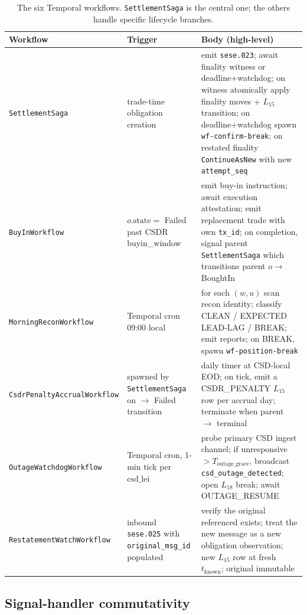 \documentclass[11pt,a4paper]{article}
\begin{document}
\begin{table}[h]
\centering
\begin{small}
\begin{tabular}{p{2.8cm}p{4.0cm}p{6.5cm}}
\toprule
\textbf{Workflow} & \textbf{Trigger} & \textbf{Body (high-level)} \\
\midrule
\texttt{SettlementSaga} & trade-time obligation creation & emit \texttt{sese.023}; await finality witness or deadline+watchdog; on witness atomically apply finality moves + $L_{15}$ transition; on deadline+watchdog spawn \texttt{wf-confirm-break}; on restated finality \texttt{ContinueAsNew} with new \texttt{attempt\_seq} \\
\texttt{BuyInWorkflow} & $o.\mathrm{state} = $ Failed past CSDR buyin\_window & emit buy-in instruction; await execution attestation; emit replacement trade with own \texttt{tx\_id}; on completion, signal parent \texttt{SettlementSaga} which transitions parent $o \to$ BoughtIn \\
\texttt{MorningReconWorkflow} & Temporal cron 09:00 local & for each $(w, u)$ scan recon identity; classify CLEAN / EXPECTED LEAD-LAG / BREAK; emit reports; on BREAK, spawn \texttt{wf-position-break} \\
\texttt{CsdrPenaltyAccrualWorkflow} & spawned by \texttt{SettlementSaga} on $\to$ Failed transition & daily timer at CSD-local EOD; on tick, emit a CSDR\_PENALTY $L_{15}$ row per accrual day; terminate when parent $\to$ terminal \\
\texttt{OutageWatchdogWorkflow} & Temporal cron, 1-min tick per $\mathrm{csd\_lei}$ & probe primary CSD ingest channel; if unresponsive $> T_{\mathrm{outage\_grace}}$, broadcast \texttt{csd\_outage\_detected}; open $L_{18}$ break; await OUTAGE\_RESUME \\
\texttt{RestatementWatchWorkflow} & inbound \texttt{sese.025} with \texttt{original\_msg\_id} populated & verify the original referenced exists; treat the new message as a new obligation observation; new $L_{15}$ row at fresh $t_{\mathrm{known}}$; original immutable \\
\bottomrule
\end{tabular}
\end{small}
\caption{The six Temporal workflows. \texttt{SettlementSaga} is the central one; the others handle specific lifecycle branches.}
\end{table}

\subsection{Signal-handler commutativity}
\end{document}
